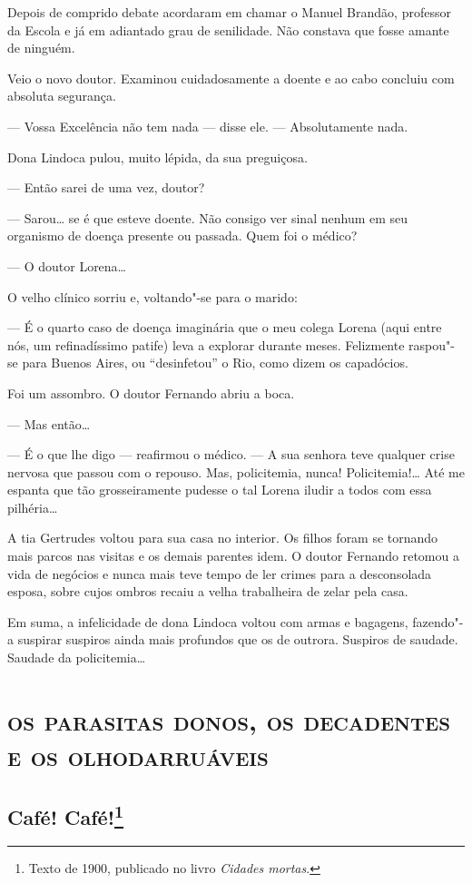 Depois de comprido debate acordaram em chamar o Manuel Brandão,
professor da Escola e já em adiantado grau de senilidade. Não constava
que fosse amante de ninguém.

Veio o novo doutor. Examinou cuidadosamente a doente e ao cabo concluiu
com absoluta segurança.

--- Vossa Excelência não tem nada --- disse ele. --- Absolutamente nada.

Dona Lindoca pulou, muito lépida, da sua preguiçosa.

--- Então sarei de uma vez, doutor?

--- Sarou\ldots{} se é que esteve doente. Não consigo ver sinal nenhum em seu
organismo de doença presente ou passada. Quem foi o médico?

--- O doutor Lorena\ldots{}

O velho clínico sorriu e, voltando"-se para o marido:

--- É o quarto caso de doença imaginária que o meu colega Lorena (aqui
entre nós, um refinadíssimo patife) leva a explorar durante meses.
Felizmente raspou"-se para Buenos Aires, ou ``desinfetou'' o Rio, como
dizem os capadócios.

Foi um assombro. O doutor Fernando abriu a boca.

--- Mas então\ldots{}

--- É o que lhe digo --- reafirmou o médico. --- A sua senhora teve
qualquer crise nervosa que passou com o repouso. Mas, policitemia,
nunca! Policitemia!\ldots{} Até me espanta que tão grosseiramente pudesse o
tal Lorena iludir a todos com essa pilhéria\ldots{}

A tia Gertrudes voltou para sua casa no interior. Os filhos foram se
tornando mais parcos nas visitas e os demais parentes idem. O doutor
Fernando retomou a vida de negócios e nunca mais teve tempo de ler
crimes para a desconsolada esposa, sobre cujos ombros recaiu a velha
trabalheira de zelar pela casa.

Em suma, a infelicidade de dona Lindoca voltou com armas e bagagens,
fazendo"-a suspirar suspiros ainda mais profundos que os de outrora.
Suspiros de saudade. Saudade da policitemia\ldots{}

\part{\textsc{os parasitas donos, os decadentes e os olhodarruáveis}}

\chapter{Café! Café!\footnote[*]{Texto de 1900, publicado no livro \emph{Cidades mortas}.}}

